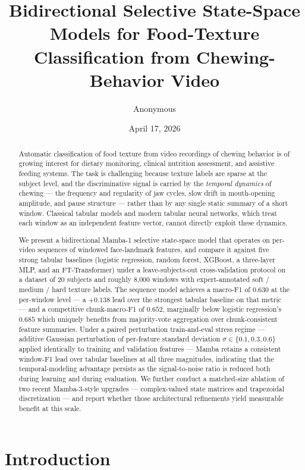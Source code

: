 \documentclass{article}
\title{Bidirectional Selective State-Space Models for Food-Texture Classification from Chewing-Behavior Video}
\author{Anonymous}
\date{April 17, 2026}
\begin{document}
\maketitle

\begin{abstract}
Automatic classification of food texture from video recordings of chewing behavior is of growing interest for dietary monitoring, clinical nutrition assessment, and assistive feeding systems. The task is challenging because texture labels are sparse at the subject level, and the discriminative signal is carried by the \emph{temporal dynamics} of chewing --- the frequency and regularity of jaw cycles, slow drift in mouth-opening amplitude, and pause structure --- rather than by any single static summary of a short window. Classical tabular models and modern tabular neural networks, which treat each window as an independent feature vector, cannot directly exploit these dynamics.

We present a bidirectional Mamba-1 selective state-space model that operates on per-video sequences of windowed face-landmark features, and compare it against five strong tabular baselines (logistic regression, random forest, XGBoost, a three-layer MLP, and an FT-Transformer) under a leave-subjects-out cross-validation protocol on a dataset of 20 subjects and roughly 8,000 windows with expert-annotated soft / medium / hard texture labels. The sequence model achieves a macro-F1 of $0.630$ at the per-window level --- a $+0.138$ lead over the strongest tabular baseline on that metric --- and a competitive chunk-macro-F1 of $0.652$, marginally below logistic regression's $0.685$ which uniquely benefits from majority-vote aggregation over chunk-consistent feature summaries. Under a paired perturbation train-and-eval stress regime --- additive Gaussian perturbation of per-feature standard deviation $\sigma \in \{0.1, 0.3, 0.6\}$ applied identically to training and validation features --- Mamba retains a consistent window-F1 lead over tabular baselines at all three magnitudes, indicating that the temporal-modeling advantage persists as the signal-to-noise ratio is reduced both during learning and during evaluation. We further conduct a matched-size ablation of two recent Mamba-3-style upgrades --- complex-valued state matrices and trapezoidal discretization --- and report whether those architectural refinements yield measurable benefit at this scale.
\end{abstract}

\section{Introduction}
\end{document}
